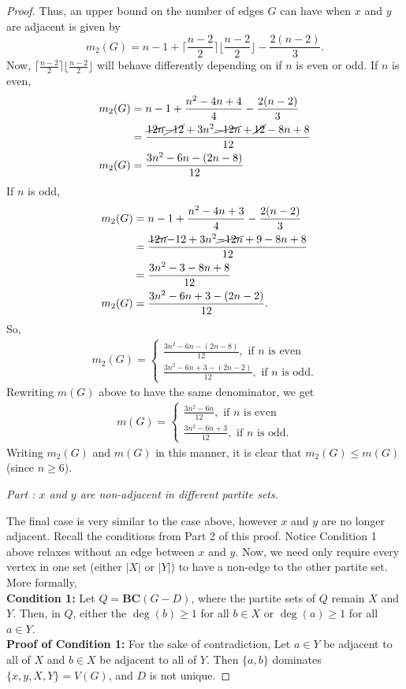\documentclass[12pt]{amsart}
\makeatletter
\newcounter{proofpart}
\newcommand{\proofpart}[1]{%
  \par
  \addvspace{\medskipamount}%
  \stepcounter{proofpart}%
  \noindent\emph{Part \theproofpart: #1}\par\nobreak\smallskip
  \@afterheading
}
\makeatother
\begin{document}
\begin{proof}
Thus, an upper bound on the number of edges $G$ can have when $x$ and $y$ are adjacent is given by $$m_2(G) = n - 1 + \Big\lceil\frac{n-2}{2}\Big\rceil\Big\lfloor\frac{n-2}{2}\Big\rfloor - \frac{2(n-2)}{3}.$$
Now, $\lceil\frac{n-2}{2}\rceil\lfloor\frac{n-2}{2}\rfloor$ will behave differently depending on if $n$ is even or odd. If $n$ is even, \begin{align*}
    m_2(G) &= n-1 + \frac{n^2 - 4n + 4}{4} - \frac{2(n-2)}{3}\\
    &= \frac{\cancel{12n}  \cancel{- 12} + 3n^2 \cancel{- 12n} + \cancel{12} - 8n + 8}{12}\\
    m_2(G)&= \frac{3n^2 - 6n - (2n-8)}{12}\label{eq:m_2even}
\end{align*}
If $n$ is odd,
\begin{align*}
     m_2(G) &= n-1 + \frac{n^2 - 4n + 3}{4} - \frac{2(n-2)}{3}\\
    &= \frac{\cancel{12n}  {- 12} + 3n^2 \cancel{- 12n} + {9} - 8n + 8}{12}\\
    &= \frac{3n^2 - 3 - 8n + 8}{12} \\
    m_2(G)&= \frac{3n^2 - 6n + 3 - (2n-2)}{12}.
\end{align*}
So, \begin{align*}
    m_2(G) = \begin{cases}
        \frac{3n^2 - 6n - (2n-8)}{12}, \text{  if $n$ is even}\\
        \frac{3n^2 - 6n + 3 - (2n-2)}{12}, \text{ if $n$ is odd.}
    \end{cases}
\end{align*}
Rewriting $m(G)$ above to have the same denominator, we get
\begin{align*}
    m(G) = \begin{cases}
        \frac{3n^2 - 6n}{12}, \text{     if $n$ is even}\\
        \frac{3n^2 - 6n + 3}{12},\text{     if $n$ is odd.}
    \end{cases}
\end{align*}
Writing $m_2(G)$ and $m(G)$ in this manner, it is clear that $m_2(G) \leq m(G)$ (since $n \geq 6$).\\
\proofpart{$x$ and $y$ are non-adjacent in different partite sets.}The final case is very similar to the case above, however $x$ and $y$ are no longer adjacent. Recall the conditions from Part 2 of this proof. Notice Condition 1 above relaxes without an edge between $x$ and $y$. Now, we need only require every vertex in one set (either $|X|$ or $|Y|$) to have a non-edge to the other partite set. More formally,\\
\textbf{Condition 1:} Let $Q = \mathbf{BC}(G - D)$, where the partite sets of $Q$ remain $X$ and $Y$. Then, in $Q$, either the $\deg(b) \geq 1$ for all $b \in X$ or $\deg(a) \geq 1$ for all $a \in Y$.\\
\textbf{Proof of Condition 1:} For the sake of contradiction, Let $a \in Y$ be adjacent to all of $X$ and $b \in X$ be adjacent to all of $Y$. Then $\{a,b\}$ dominates $\{x,y,X,Y\} = V(G)$, and $D$ is not unique.


\end{proof}
\end{document}
